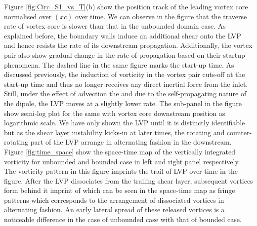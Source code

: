 \documentclass[final,3p,10pt,times,review,authoryear]{elsarticle}
\begin{document}
	Figure \ref{fig:Circ_S1_vs_T}(b) show the position track of the leading vortex core normalised over  $(xc)$ over time. We can observe in the figure that the traverse rate of vortex core is slower than that in the unbounded domain case. As explained before, the boundary walls induce an additional shear onto the LVP and hence resists the rate of its downstream propagation. Additionally, the vortex pair also show gradual change in the rate of propagation based on their startup phenomena. The dashed line in the same figure marks the start-up time. As discussed previously, the induction of vorticity in the vortex pair cuts-off at the start-up time and thus no longer receives any direct inertial force from the inlet. Still, under the effect of advection the and due to the self-propagating nature of the dipole, the LVP moves at a slightly lower rate. The sub-panel in the figure show semi-log plot for the same with vortex core downstream position as logarithmic scale. We have only shown the LVP until it is distinctly identifiable but as the shear layer instability kicks-in at later times, the rotating and counter-rotating part of the LVP arrange in alternating fashion in the downstream. Figure \ref{fig:time_space} show the space-time map of the vertically integrated vorticity for unbounded and bounded case in left and right panel respectively. The vorticity pattern in this figure imprints the trail of LVP  over time in the figure. After the LVP dissociates from the trailing shear layer, subsequent vortices form behind it imprint of which can be seen in the space-time map as fringe patterns which corresponds to the arrangement of dissociated vortices in alternating fashion. An early lateral spread of these released vortices is a noticeable difference in the case of unbounded case with that of bounded case.
\end{document}
